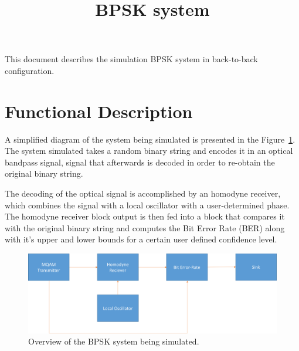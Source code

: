 \documentclass[a4paper]{article}
\title{BPSK system}
\author{ }
\newcommand{\onlyinsubfile}[1]{#1}
\newcommand{\notinsubfile}[1]{}
\begin{document}
\renewcommand{\onlyinsubfile}[1]{}
\renewcommand{\notinsubfile}[1]{#1}

\maketitle

This document describes the simulation BPSK system in back-to-back configuration. 

\section{Functional Description}

A simplified diagram of the system being simulated is presented in the Figure~\ref{fig:physicalsystem}. The system simulated takes a random binary string and encodes it in an optical bandpass signal, signal that afterwards is decoded in order to re-obtain the original binary string.
\par
The decoding of the optical signal is accomplished by an homodyne receiver, which combines the signal with a local oscillator with a user-determined phase. The homodyne receiver block output is then fed into a block that compares it with the original binary string and computes the Bit Error Rate (BER) along with it's upper and lower bounds for a certain user defined confidence level.


\begin{figure}[h]
\centering
\includegraphics[width=\linewidth]{bpskdiagram.png}
\caption{Overview of the BPSK system being simulated.}
\label{fig:physicalsystem}
\end{figure}

\end{document}
